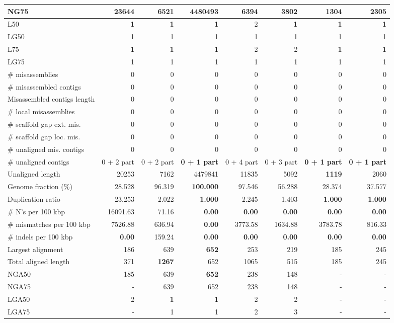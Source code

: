 \documentclass[12pt,a4paper]{article}
\begin{document}
\begin{table}[ht]
\begin{center}
\begin{tabular}{|l*{7}{|r}|}
NG75 & 23644 & 6521 & {\bf 4480493} & 6394 & 3802 & 1304 & 2305 \\ \hline
L50 & {\bf 1} & {\bf 1} & {\bf 1} & 2 & {\bf 1} & {\bf 1} & {\bf 1} \\ \hline
LG50 & 1 & 1 & 1 & 1 & 1 & 1 & 1 \\ \hline
L75 & {\bf 1} & {\bf 1} & {\bf 1} & 2 & 2 & {\bf 1} & {\bf 1} \\ \hline
LG75 & 1 & 1 & 1 & 1 & 1 & 1 & 1 \\ \hline
\# misassemblies & 0 & 0 & 0 & 0 & 0 & 0 & 0 \\ \hline
\# misassembled contigs & 0 & 0 & 0 & 0 & 0 & 0 & 0 \\ \hline
Misassembled contigs length & 0 & 0 & 0 & 0 & 0 & 0 & 0 \\ \hline
\# local misassemblies & 0 & 0 & 0 & 0 & 0 & 0 & 0 \\ \hline
\# scaffold gap ext. mis. & 0 & 0 & 0 & 0 & 0 & 0 & 0 \\ \hline
\# scaffold gap loc. mis. & 0 & 0 & 0 & 0 & 0 & 0 & 0 \\ \hline
\# unaligned mis. contigs & 0 & 0 & 0 & 0 & 0 & 0 & 0 \\ \hline
\# unaligned contigs & 0 + 2 part & 0 + 2 part & {\bf 0 + 1 part} & 0 + 4 part & 0 + 3 part & {\bf 0 + 1 part} & {\bf 0 + 1 part} \\ \hline
Unaligned length & 20253 & 7162 & 4479841 & 11835 & 5092 & {\bf 1119} & 2060 \\ \hline
Genome fraction (\%) & 28.528 & 96.319 & {\bf 100.000} & 97.546 & 56.288 & 28.374 & 37.577 \\ \hline
Duplication ratio & 23.253 & 2.022 & {\bf 1.000} & 2.245 & 1.403 & {\bf 1.000} & {\bf 1.000} \\ \hline
\# N's per 100 kbp & 16091.63 & 71.16 & {\bf 0.00} & {\bf 0.00} & {\bf 0.00} & {\bf 0.00} & {\bf 0.00} \\ \hline
\# mismatches per 100 kbp & 7526.88 & 636.94 & {\bf 0.00} & 3773.58 & 1634.88 & 3783.78 & 816.33 \\ \hline
\# indels per 100 kbp & {\bf 0.00} & 159.24 & {\bf 0.00} & {\bf 0.00} & {\bf 0.00} & {\bf 0.00} & {\bf 0.00} \\ \hline
Largest alignment & 186 & 639 & {\bf 652} & 253 & 219 & 185 & 245 \\ \hline
Total aligned length & 371 & {\bf 1267} & 652 & 1065 & 515 & 185 & 245 \\ \hline
NGA50 & 185 & 639 & {\bf 652} & 238 & 148 & - & - \\ \hline
NGA75 & - & 639 & 652 & 238 & 148 & - & - \\ \hline
LGA50 & 2 & {\bf 1} & {\bf 1} & 2 & 2 & - & - \\ \hline
LGA75 & - & 1 & 1 & 2 & 3 & - & - \\ \hline
\end{tabular}
\end{center}
\end{table}
\end{document}
